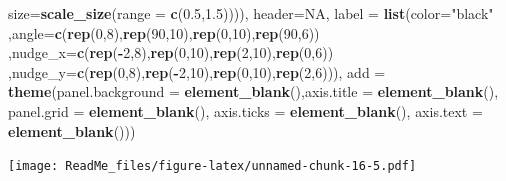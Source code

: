 \documentclass[
]{article}
\newenvironment{Shaded}{\begin{snugshade}}{\end{snugshade}}
\newcommand{\DataTypeTok}[1]{\textcolor[rgb]{0.13,0.29,0.53}{#1}}
\newcommand{\DecValTok}[1]{\textcolor[rgb]{0.00,0.00,0.81}{#1}}
\newcommand{\FloatTok}[1]{\textcolor[rgb]{0.00,0.00,0.81}{#1}}
\newcommand{\KeywordTok}[1]{\textcolor[rgb]{0.13,0.29,0.53}{\textbf{#1}}}
\newcommand{\NormalTok}[1]{#1}
\newcommand{\OperatorTok}[1]{\textcolor[rgb]{0.81,0.36,0.00}{\textbf{#1}}}
\newcommand{\OtherTok}[1]{\textcolor[rgb]{0.56,0.35,0.01}{#1}}
\newcommand{\StringTok}[1]{\textcolor[rgb]{0.31,0.60,0.02}{#1}}
\begin{document}
\begin{Shaded}
\begin{Highlighting}[]
                                \DataTypeTok{size=}\KeywordTok{scale_size}\NormalTok{(}\DataTypeTok{range =} \KeywordTok{c}\NormalTok{(}\FloatTok{0.5}\NormalTok{,}\FloatTok{1.5}\NormalTok{)))),}
       \DataTypeTok{header=}\OtherTok{NA}\NormalTok{,}
       \DataTypeTok{label =} \KeywordTok{list}\NormalTok{(}\DataTypeTok{color=}\StringTok{"black"}
\NormalTok{                    ,}\DataTypeTok{angle=}\KeywordTok{c}\NormalTok{(}\KeywordTok{rep}\NormalTok{(}\DecValTok{0}\NormalTok{,}\DecValTok{8}\NormalTok{),}\KeywordTok{rep}\NormalTok{(}\DecValTok{90}\NormalTok{,}\DecValTok{10}\NormalTok{),}\KeywordTok{rep}\NormalTok{(}\DecValTok{0}\NormalTok{,}\DecValTok{10}\NormalTok{),}\KeywordTok{rep}\NormalTok{(}\DecValTok{90}\NormalTok{,}\DecValTok{6}\NormalTok{))}
\NormalTok{                    ,}\DataTypeTok{nudge_x=}\KeywordTok{c}\NormalTok{(}\KeywordTok{rep}\NormalTok{(}\OperatorTok{-}\DecValTok{2}\NormalTok{,}\DecValTok{8}\NormalTok{),}\KeywordTok{rep}\NormalTok{(}\DecValTok{0}\NormalTok{,}\DecValTok{10}\NormalTok{),}\KeywordTok{rep}\NormalTok{(}\DecValTok{2}\NormalTok{,}\DecValTok{10}\NormalTok{),}\KeywordTok{rep}\NormalTok{(}\DecValTok{0}\NormalTok{,}\DecValTok{6}\NormalTok{))}
\NormalTok{                    ,}\DataTypeTok{nudge_y=}\KeywordTok{c}\NormalTok{(}\KeywordTok{rep}\NormalTok{(}\DecValTok{0}\NormalTok{,}\DecValTok{8}\NormalTok{),}\KeywordTok{rep}\NormalTok{(}\OperatorTok{-}\DecValTok{2}\NormalTok{,}\DecValTok{10}\NormalTok{),}\KeywordTok{rep}\NormalTok{(}\DecValTok{0}\NormalTok{,}\DecValTok{10}\NormalTok{),}\KeywordTok{rep}\NormalTok{(}\DecValTok{2}\NormalTok{,}\DecValTok{6}\NormalTok{))),}
       \DataTypeTok{add   =}  \KeywordTok{theme}\NormalTok{(}\DataTypeTok{panel.background =} \KeywordTok{element_blank}\NormalTok{(),}\DataTypeTok{axis.title =} \KeywordTok{element_blank}\NormalTok{(),}
                      \DataTypeTok{panel.grid =} \KeywordTok{element_blank}\NormalTok{(),}
                      \DataTypeTok{axis.ticks =} \KeywordTok{element_blank}\NormalTok{(),}
                      \DataTypeTok{axis.text =} \KeywordTok{element_blank}\NormalTok{()))}
\end{Highlighting}
\end{Shaded}

\texttt{[image: ReadMe\_files/figure-latex/unnamed-chunk-16-5.pdf]}
\end{document}
